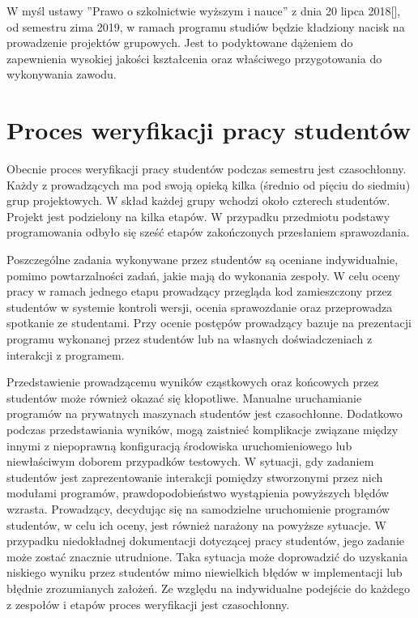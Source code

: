 W myśl ustawy ”Prawo o szkolnictwie wyższym i nauce” z dnia 20 lipca 2018[], od semestru zima 2019, w ramach programu studiów będzie kładziony nacisk na prowadzenie projektów grupowych.
Jest to podyktowane dążeniem do zapewnienia wysokiej jakości kształcenia oraz właściwego przygotowania do wykonywania zawodu.

\vfill

\section{Proces weryfikacji pracy studentów}

Obecnie proces weryfikacji pracy studentów podczas semestru jest czasochłonny.
Każdy z prowadzących ma pod swoją opieką kilka (średnio od pięciu do siedmiu) grup projektowych.
W skład każdej grupy wchodzi około czterech studentów.
Projekt jest podzielony na kilka etapów. 
W przypadku przedmiotu podstawy programowania odbyło się sześć etapów zakończonych przesłaniem sprawozdania.

Poszczególne zadania wykonywane przez studentów są oceniane indywidualnie, pomimo powtarzalności zadań, jakie mają do wykonania zespoły.
W celu oceny pracy w ramach jednego etapu prowadzący przegląda kod zamieszczony przez studentów w systemie kontroli wersji, ocenia sprawozdanie oraz przeprowadza spotkanie ze studentami.
Przy ocenie postępów prowadzący bazuje na prezentacji programu wykonanej przez studentów lub na własnych doświadczeniach z interakcji z programem.

Przedstawienie prowadzącemu wyników cząstkowych oraz końcowych przez studentów może również okazać się kłopotliwe.
Manualne uruchamianie programów na prywatnych maszynach studentów jest czasochłonne.
Dodatkowo podczas przedstawiania wyników, mogą zaistnieć komplikacje związane między innymi z niepoprawną konfiguracją środowiska uruchomieniowego lub niewłaściwym doborem przypadków testowych.
W sytuacji, gdy zadaniem studentów jest zaprezentowanie interakcji pomiędzy stworzonymi przez nich modułami programów, prawdopodobieństwo wystąpienia powyższych błędów wzrasta.
Prowadzący, decydując się na samodzielne uruchomienie programów studentów, w celu ich oceny, jest również narażony na powyższe sytuacje.
W przypadku niedokładnej dokumentacji dotyczącej pracy studentów, jego zadanie może zostać znacznie utrudnione.
Taka sytuacja może doprowadzić do uzyskania niskiego wyniku przez studentów mimo niewielkich błędów w implementacji lub błędnie zrozumianych założeń.
Ze względu na indywidualne podejście do każdego z zespołów i etapów proces weryfikacji jest czasochłonny.


